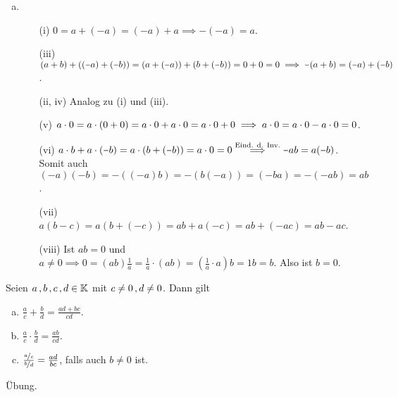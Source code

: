 \documentclass[../ana1.tex]{subfiles}
\begin{document}
\begin{bew}\leavevmode
	\begin{enumerate}[(a)]
		\item \begin{enumerate}
				\item[(i)] \(0 = a + (\minus a) = (\minus a) + a \implies \minus(\minus a) = a\).
				\item[(iii)] \((a+b) + ((\minus a)+(\minus b)) = (a + (\minus a)) + (b + (\minus b)) = 0 + 0 = 0\\
							 \implies \minus(a+b) = (\minus a) + (\minus b)\).
				\item[(ii, iv)] Analog zu (i) und (iii).
				\item[(v)] \(a\cdot 0 = a \cdot (0+0) =a \cdot 0 + a \cdot 0 = a \cdot 0 + 0\\
						   \implies a \cdot 0 = a \cdot 0 - a \cdot 0 = 0\).
				\item[(vi)] \(a \cdot b + a \cdot (\minus b) = a \cdot (b + (\minus b)) = a \cdot 0= 0\\
							\overset{\text{Eind. d. Inv.}}{\implies} \minus ab = a(\minus b)\).\\
							Somit auch \((\minus a)(\minus b) = \minus((\minus a)b) = \minus(b(\minus a)) = (\minus ba) = \minus(\minus ab) = ab\).
				\item[(vii)] \(a(b - c) = a(b + (\minus c)) = ab + a(\minus c)= ab + (\minus ac)= ab - ac\).
				\item[(viii)] Ist \(ab = 0\) und \(a \neq 0 \implies 0 = (ab)\frac{1}{a} = \frac{1}{a} \cdot (ab) = (\frac{1}{a} \cdot a)b = 1b = b\).
							  Also ist \(b = 0\).\qedhere
			  \end{enumerate}
	\end{enumerate}
\end{bew}

\begin{satz}[Bruchrechnen]\label{satz:bruchrechnen}
	Seien \(a \operatorname{,} b \operatorname{,} c \operatorname{,} d \in \mathbb{K}\) mit \(c\neq 0 \operatorname{,} d\neq 0\). Dann gilt
	\begin{enumerate}[(a)]
		\item \(\frac{a}{c} + \frac{b}{d} = \frac{ad + bc}{cd}\).
		\item \(\frac{a}{c} \cdot \frac{b}{d} = \frac{ab}{cd}\).
		\item \(\frac{\nicefrac{a}{c}}{\nicefrac{b}{d}} = \frac{ad}{bc}\), falls auch \(b\neq 0\) ist.
	\end{enumerate}
\end{satz}
\begin{bew}
	Übung.\phantom{\qedhere}
\end{bew}
\end{document}
